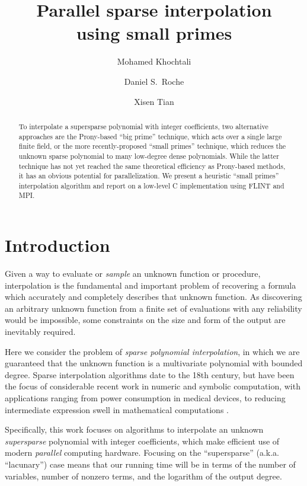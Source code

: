 \documentclass[letterpaper,10pt]{article}
\title{Parallel sparse interpolation\\ using small primes}
\author{Mohamed Khochtali}
\author{Daniel S.\ Roche}
\author{Xisen Tian}
\affil{\small Computer Science Department\\United States Naval Academy\\
Annapolis, Maryland, USA}
\def\cite{\citep}
\begin{document}
\maketitle


\begin{abstract}
  To interpolate a supersparse polynomial with integer coefficients, two
  alternative approaches are the Prony-based ``big prime'' technique,
  which acts over a single large finite field, or the more
  recently-proposed ``small primes'' technique, which reduces the unknown
  sparse polynomial to many low-degree dense polynomials.
  While the latter technique
  has not yet reached the same theoretical efficiency as Prony-based
  methods, it has an obvious potential for parallelization. We present a
  heuristic ``small primes'' interpolation algorithm and report on a
  low-level C implementation using FLINT and MPI.
\end{abstract}



\section{Introduction}

Given a way to evaluate or \emph{sample} an unknown function or
procedure, interpolation is the fundamental and important problem of
recovering a formula which accurately and completely describes that
unknown function. As discovering an arbitrary unknown function from a
finite set of evaluations with any reliability would be impossible, some
constraints on the size and form of the output are inevitably required.

Here we consider the problem of \emph{sparse polynomial interpolation},
in which we are guaranteed that the unknown function is a multivariate
polynomial with bounded degree. Sparse interpolation algorithms date to
the 18th century, but have been the focus of considerable recent work in
numeric and symbolic computation,
with applications ranging from power consumption in medical devices, 
to reducing intermediate expression swell in mathematical computations
\cite{CL08,Kal10a,KLY11,BCK12}.

Specifically, this work focuses on algorithms to interpolate an unknown
\emph{supersparse} polynomial with integer coefficients, which make
efficient use of modern \emph{parallel} computing hardware. Focusing on
the ``supersparse'' (a.k.a. ``lacunary'') case means that our running
time will be in terms of the number of variables, number of nonzero
terms, and the logarithm of the output degree. 
\end{document}
